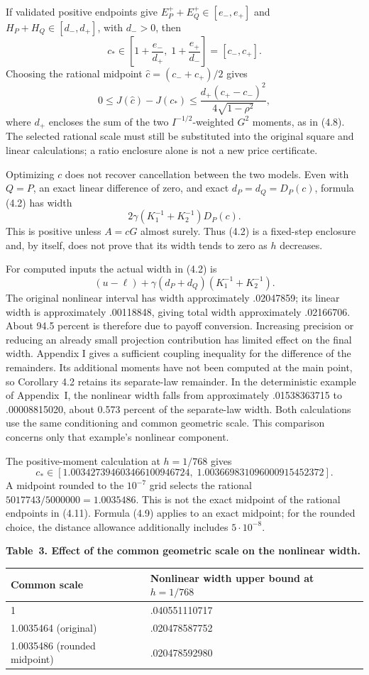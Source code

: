 \documentclass[11pt,a4paper]{article}
\begin{document}
If validated positive endpoints give
\(E_P^++E_Q^+\in[e_-,e_+]\) and \(H_P+H_Q\in[d_-,d_+]\), with
\(d_->0\), then
\[
c_*\in\left[1+\frac{e_-}{d_+},\;1+\frac{e_+}{d_-}\right]=[c_-,c_+].
\]
Choosing the rational midpoint \(\widehat c=(c_-+c_+)/2\) gives
\[
0\le J(\widehat c)-J(c_*)
\le \frac{d_+(c_+-c_-)^2}{4\sqrt{1-\rho^2}},    \tag{4.9}
\]
where \(d_+\) encloses the sum of the two \(I^{-1/2}\)-weighted
\(G^2\) moments, as in (4.8). The selected rational scale must still be
substituted into the original square and linear calculations; a ratio
enclosure alone is not a new price certificate.

Optimizing \(c\) does not recover cancellation between the two models.
Even with \(Q=P\), an exact linear difference of zero, and exact
\(d_P=d_Q=D_P(c)\), formula (4.2) has width
\[
2\gamma\left(K_1^{-1}+K_2^{-1}\right)D_P(c).
\]
This is positive unless \(A=cG\) almost surely. Thus (4.2) is a fixed-step
enclosure and, by itself, does not prove that its width tends to zero as
\(h\) decreases.


For computed inputs the actual width in (4.2) is
\[
(u-\ell)+\gamma(d_P+d_Q)(K_1^{-1}+K_2^{-1}).
\tag{4.10}
\]
The original nonlinear interval has width approximately .02047859; its linear
width is approximately .00118848, giving total width approximately .02166706.
About 94.5 percent is therefore due to payoff conversion. Increasing precision
or reducing an already small projection contribution has limited effect on the final width.
Appendix I gives a sufficient coupling inequality for the difference of the
remainders. Its additional moments have not been computed at the main point,
so Corollary 4.2 retains its separate-law remainder. In the deterministic example
of Appendix~I, the nonlinear width falls from approximately .01538363715 to
.00008815020, about 0.573 percent of the separate-law width. Both calculations
use the same conditioning and common geometric scale. This comparison concerns
only that example's nonlinear component.

The positive-moment calculation at \(h=1/768\) gives
\[
c_*\in[1.003427394603466100946724,\;1.003669831096000915452372].
\tag{4.11}
\]
A midpoint rounded to the \(10^{-7}\) grid selects the rational
\(5017743/5000000=1.0035486\). This is not the exact midpoint of the rational
endpoints in (4.11). Formula (4.9) applies to an exact midpoint; for the rounded
choice, the distance allowance additionally includes \(5\cdot10^{-8}\).

\noindent\textbf{Table~3. Effect of the common geometric scale on the nonlinear width.}
\begin{center}
\begin{tabularx}{\textwidth}{@{}l X@{}}
\toprule
Common scale & Nonlinear width upper bound at \(h=1/768\) \\
\midrule
1 & .040551110717 \\
1.0035464 (original) & .020478587752 \\
1.0035486 (rounded midpoint) & .020478592980 \\
\bottomrule
\end{tabularx}
\end{center}
\end{document}
